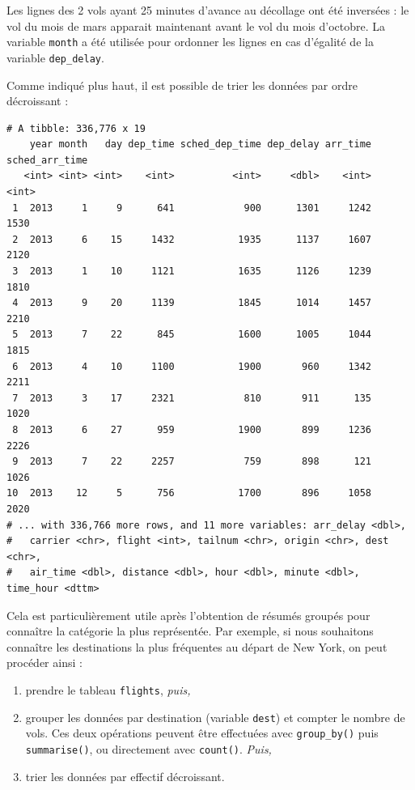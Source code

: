 \documentclass[a4paperpaper,]{article}
\newenvironment{Shaded}{\begin{snugshade}}{\end{snugshade}}
\newcommand{\KeywordTok}[1]{\textcolor[rgb]{0.13,0.29,0.53}{\textbf{#1}}}
\newcommand{\StringTok}[1]{\textcolor[rgb]{0.31,0.60,0.02}{#1}}
\newcommand{\OperatorTok}[1]{\textcolor[rgb]{0.81,0.36,0.00}{\textbf{#1}}}
\newcommand{\NormalTok}[1]{#1}
\providecommand{\tightlist}{%
  \setlength{\itemsep}{0pt}\setlength{\parskip}{0pt}}
\theoremstyle{definition}
\theoremstyle{definition}
\theoremstyle{definition}
\theoremstyle{remark}
\begin{document}
Les lignes des 2 vols ayant 25 minutes d'avance au décollage ont été
inversées : le vol du mois de mars apparait maintenant avant le vol du
mois d'octobre. La variable \texttt{month} a été utilisée pour ordonner
les lignes en cas d'égalité de la variable \texttt{dep\_delay}.

Comme indiqué plus haut, il est possible de trier les données par ordre
décroissant :

\begin{Shaded}
\end{Shaded}

\begin{verbatim}
# A tibble: 336,776 x 19
    year month   day dep_time sched_dep_time dep_delay arr_time sched_arr_time
   <int> <int> <int>    <int>          <int>     <dbl>    <int>          <int>
 1  2013     1     9      641            900      1301     1242           1530
 2  2013     6    15     1432           1935      1137     1607           2120
 3  2013     1    10     1121           1635      1126     1239           1810
 4  2013     9    20     1139           1845      1014     1457           2210
 5  2013     7    22      845           1600      1005     1044           1815
 6  2013     4    10     1100           1900       960     1342           2211
 7  2013     3    17     2321            810       911      135           1020
 8  2013     6    27      959           1900       899     1236           2226
 9  2013     7    22     2257            759       898      121           1026
10  2013    12     5      756           1700       896     1058           2020
# ... with 336,766 more rows, and 11 more variables: arr_delay <dbl>,
#   carrier <chr>, flight <int>, tailnum <chr>, origin <chr>, dest <chr>,
#   air_time <dbl>, distance <dbl>, hour <dbl>, minute <dbl>, time_hour <dttm>
\end{verbatim}

Cela est particulièrement utile après l'obtention de résumés groupés
pour connaître la catégorie la plus représentée. Par exemple, si nous
souhaitons connaître les destinations la plus fréquentes au départ de
New York, on peut procéder ainsi :

\begin{enumerate}
\def\labelenumi{\arabic{enumi}.}
\tightlist
\item
  prendre le tableau \texttt{flights}, \emph{puis,}
\item
  grouper les données par destination (variable \texttt{dest}) et
  compter le nombre de vols. Ces deux opérations peuvent être effectuées
  avec \texttt{group\_by()} puis \texttt{summarise()}, ou directement
  avec \texttt{count()}. \emph{Puis,}
\item
  trier les données par effectif décroissant.
\end{enumerate}
\end{document}
